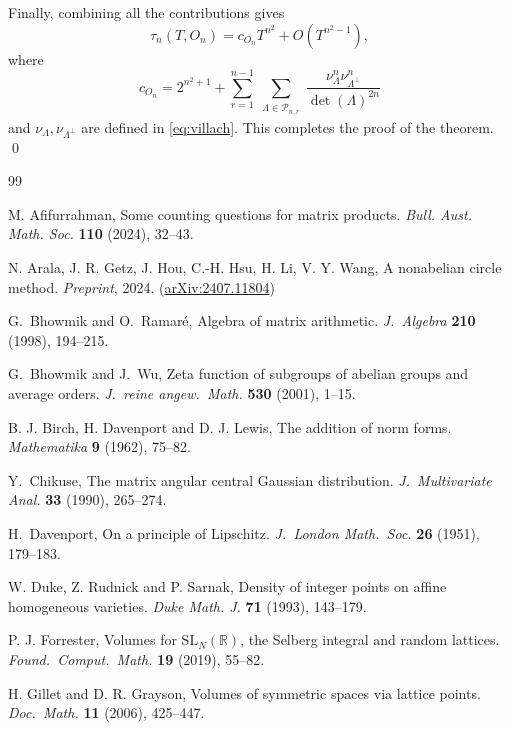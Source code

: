\documentclass[11pt,reqno]{amsart}
\theoremstyle{definition}
\theoremstyle{remark}
\numberwithin{equation}{section}
\numberwithin{thm}{section}
\numberwithin{table}{section}
\begin{document}
    Finally, combining all the contributions   gives  
    \[
    \tau_{n}(T, O_n) = c_{O_n}T^{n^2} + O(T^{n^2-1}),
    \]
    where 
    \begin{equation}\label{c_n}
        c_{O_n} = 2^{n^2+1} + \sum_{r=1}^{n-1} 
     \sum_{\substack{\Lambda \in \mathcal{P}_{n,r}}} 
     \frac{\nu_{\Lambda}^n\nu_{\Lambda^\perp}^n}
    {\det(\Lambda)^{2n}}
    \end{equation}
    and
    $\nu_{\Lambda}, \nu_{\Lambda^\perp}$ are defined  in \eqref{eq:villach}.
This completes the proof of the theorem.  \qed



\begin{thebibliography}{99}

 M. Afifurrahman, Some counting questions for matrix products. {\it Bull. Aust. Math.
Soc.} {\bf 110} (2024), 32--43.


N. Arala, J. R. Getz, J. Hou, C.-H. Hsu, H. Li, V. Y. Wang,
A nonabelian circle method. {\it Preprint}, 2024. (\href{https://arxiv.org/abs/2407.11804}{arXiv:2407.11804})

G.~Bhowmik and O.~Ramar\'e,
Algebra of matrix arithmetic.
{\it J.\ Algebra} \textbf{210} (1998), 194--215.

G.~Bhowmik and J.~Wu,
Zeta function of subgroups of abelian groups and average orders.
{\it J.\ reine angew.\ Math.} \textbf{530} (2001), 1--15.


B. J. Birch, H. Davenport and D. J. Lewis,
The addition of norm forms. {\it Mathematika} {\bf 9} (1962), 75--82.

Y.~Chikuse, 
The matrix angular central Gaussian distribution.
{\it J.\ Multivariate Anal.} \textbf{33} (1990), 265--274.

H.~Davenport,
On a principle of Lipschitz.
{\it J.\ London Math.\ Soc.} \textbf{26} (1951), 179--183.


W. Duke, Z. Rudnick and P. Sarnak, Density of integer points on
affine homogeneous varieties. {\it  Duke Math. J.}
{\bf 71} (1993), 143--179.

P. J. Forrester, 
Volumes for ${\mathrm{SL}}_N(\mathbb{R})$, the Selberg
              integral and random lattices.
{\it Found.\ Comput.\ Math.} {\bf 19} (2019), 55--82. 

H. Gillet and D. R. Grayson, 
Volumes of symmetric spaces via lattice points.
{\it Doc.\ Math.} {\bf 11} (2006),  425--447.


\end{thebibliography}
\end{document}
